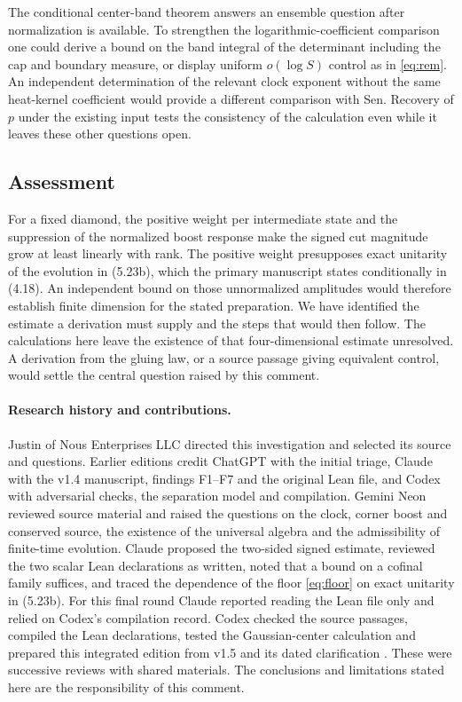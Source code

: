 \documentclass[11pt]{article}
\begin{document}
The conditional center-band theorem answers an ensemble question after normalization is available. To strengthen the logarithmic-coefficient comparison one could derive a bound on the band integral of the determinant including the cap and boundary measure, or display uniform $o(\log S)$ control as in \eqref{eq:rem}. An independent determination of the relevant clock exponent without the same heat-kernel coefficient would provide a different comparison with Sen. Recovery of $p$ under the existing input tests the consistency of the calculation even while it leaves these other questions open.

\subsection{Assessment}
For a fixed diamond, the positive weight per intermediate state and the suppression of the normalized boost response make the signed cut magnitude grow at least linearly with rank. The positive weight presupposes exact unitarity of the evolution in (5.23b), which the primary manuscript states conditionally in (4.18). An independent bound on those unnormalized amplitudes would therefore establish finite dimension for the stated preparation. We have identified the estimate a derivation must supply and the steps that would then follow. The calculations here leave the existence of that four-dimensional estimate unresolved. A derivation from the gluing law, or a source passage giving equivalent control, would settle the central question raised by this comment.

\paragraph{Research history and contributions.}
Justin of Nous Enterprises LLC directed this investigation and selected its source and questions. Earlier editions credit ChatGPT with the initial triage, Claude with the v1.4 manuscript, findings F1--F7 and the original Lean file, and Codex with adversarial checks, the separation model and compilation. Gemini Neon reviewed source material and raised the questions on the clock, corner boost and conserved source, the existence of the universal algebra and the admissibility of finite-time evolution. Claude proposed the two-sided signed estimate, reviewed the two scalar Lean declarations as written, noted that a bound on a cofinal family suffices, and traced the dependence of the floor \eqref{eq:floor} on exact unitarity in (5.23b). For this final round Claude reported reading the Lean file only and relied on Codex's compilation record. Codex checked the source passages, compiled the Lean declarations, tested the Gaussian-center calculation and prepared this integrated edition from v1.5 and its dated clarification \cite{clar}. These were successive reviews with shared materials. The conclusions and limitations stated here are the responsibility of this comment.
\end{document}
